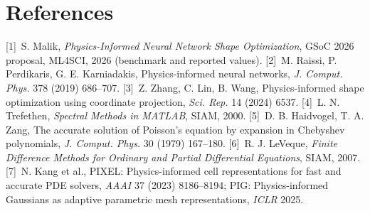 \documentclass[10pt,a4paper]{article}
\begin{document}
\section*{References}
{\footnotesize
[1]~S. Malik, \emph{Physics-Informed Neural Network Shape Optimization}, GSoC 2026
proposal, ML4SCI, 2026 (benchmark and reported values).
[2]~M. Raissi, P. Perdikaris, G. E. Karniadakis, Physics-informed neural networks,
\emph{J. Comput. Phys.} 378 (2019) 686--707.
[3]~Z. Zhang, C. Lin, B. Wang, Physics-informed shape optimization using coordinate
projection, \emph{Sci. Rep.} 14 (2024) 6537.
[4]~L. N. Trefethen, \emph{Spectral Methods in MATLAB}, SIAM, 2000.
[5]~D. B. Haidvogel, T. A. Zang, The accurate solution of Poisson's equation by
expansion in Chebyshev polynomials, \emph{J. Comput. Phys.} 30 (1979) 167--180.
[6]~R. J. LeVeque, \emph{Finite Difference Methods for Ordinary and Partial
Differential Equations}, SIAM, 2007.
[7]~N. Kang et al., PIXEL: Physics-informed cell representations for fast and
accurate PDE solvers, \emph{AAAI} 37 (2023) 8186--8194; PIG: Physics-informed
Gaussians as adaptive parametric mesh representations, \emph{ICLR} 2025.
\par}
\end{document}
